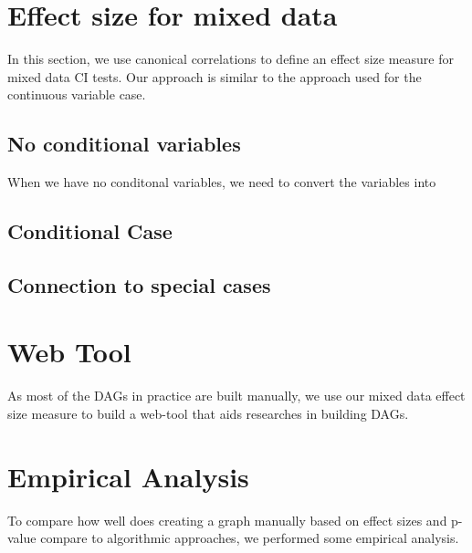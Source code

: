 \documentclass{article}
\begin{document}
\section{Effect size for mixed data}
In this section, we use canonical correlations to define an effect size measure
for mixed data CI tests. Our approach is similar to the approach used for the
continuous variable case. 

\subsection{No conditional variables}
When we have no conditonal variables, we need to convert the variables into 

\subsection{Conditional Case}

\subsection{Connection to special cases}

\section{Web Tool}
As most of the DAGs in practice are built manually, we use our mixed data effect size measure to build a web-tool that aids researches in building DAGs.


\section{Empirical Analysis}
To compare how well does creating a graph manually based on effect sizes and
p-value compare to algorithmic approaches, we performed some empirical
analysis.
\end{document}
